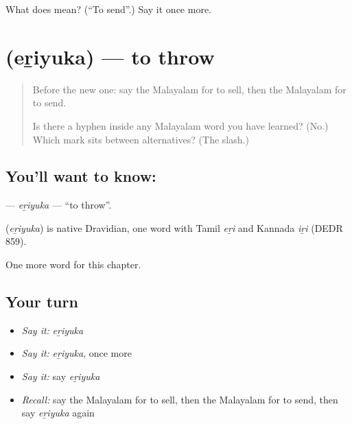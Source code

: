 \begin{tcolorbox}[breakable,colback=teal!4,colframe=teal!35!black,title={Before you move on}]
What does  mean? (\textquotedblleft{}To send\textquotedblright{}.) Say it once more.
\end{tcolorbox}
\section[\texorpdfstring{\ml{എറിയുക} (eṟiyuka)}{എറിയുക (eṟiyuka)}]{ (eṟiyuka) — to throw}

\label{lesson:ML-C175-eriyuka}



\begin{quote}
Before the new one: say the Malayalam for to sell, then the Malayalam for to send.

Is there a hyphen inside any Malayalam word you have learned? (No.) Which mark sits between alternatives? (The slash.)
\end{quote}

\subsection*{You'll want to know: }
\textbf{} — \emph{eṟiyuka} — \textquotedblleft{}to throw\textquotedblright{}.

\begin{cousinweb}
\textbf{} (\emph{eṟiyuka}) is native Dravidian, one word with Tamil \emph{eṟi} and Kannada \emph{iṟi} (DEDR 859).
\end{cousinweb}

\begin{grammarlens}[title={What you've built}]
One more word for this chapter.
\end{grammarlens}

\subsection*{Your turn}
\begin{itemize}
\raggedright
  \item \emph{Say it:} \emph{eṟiyuka}
  \item \emph{Say it:} \emph{eṟiyuka}, once more
  \item \emph{Say it:} say \emph{eṟiyuka}
  \item \emph{Recall:} say the Malayalam for to sell, then the Malayalam for to send, then say \emph{eṟiyuka} again
\end{itemize}

